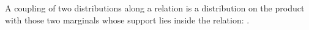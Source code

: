 \begin{definition}
  \label{def:coupling}
  \leanok
  A coupling of two distributions along a relation is a distribution on the product with those two marginals whose support lies inside the relation: .
\end{definition}
